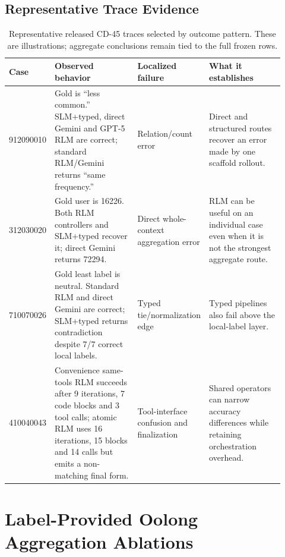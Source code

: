 \subsection{Representative Trace Evidence}
\label{app:traces}

\begin{table}[!htbp]
\caption{Representative released CD-45 traces selected by outcome pattern. These are illustrations; aggregate conclusions remain tied to the full frozen rows.}
\label{tab:appendix-traces}
\centering
\footnotesize
\setlength{\tabcolsep}{3pt}
\begin{tabular}{@{}p{0.12\linewidth}p{0.31\linewidth}p{0.20\linewidth}p{0.29\linewidth}@{}}
\toprule
\textbf{Case} & \textbf{Observed behavior} & \textbf{Localized failure} & \textbf{What it establishes} \\
\midrule
912090010 & Gold is ``less common.'' SLM+typed, direct Gemini and GPT-5 RLM are correct; standard RLM/Gemini returns ``same frequency.'' & Relation/count error & Direct and structured routes recover an error made by one scaffold rollout. \\
312030020 & Gold user is 16226. Both RLM controllers and SLM+typed recover it; direct Gemini returns 72294. & Direct whole-context aggregation error & RLM can be useful on an individual case even when it is not the strongest aggregate route. \\
710070026 & Gold least label is neutral. Standard RLM and direct Gemini are correct; SLM+typed returns contradiction despite 7/7 correct local labels. & Typed tie/normalization edge & Typed pipelines also fail above the local-label layer. \\
410040043 & Convenience same-tools RLM succeeds after 9 iterations, 7 code blocks and 3 tool calls; atomic RLM uses 16 iterations, 15 blocks and 14 calls but emits a non-matching final form. & Tool-interface confusion and finalization & Shared operators can narrow accuracy differences while retaining orchestration overhead. \\
\bottomrule
\end{tabular}
\end{table}

\FloatBarrier
\section{Label-Provided Oolong Aggregation Ablations}

